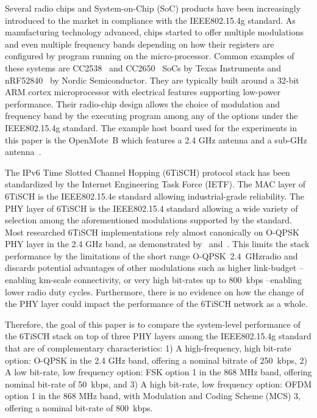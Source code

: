 \documentclass[journal]{IEEEtran}
\newcommand{\oqpsk}        {O-QPSK~2.4~GHz}
\begin{document}

Several radio chips and System-on-Chip (SoC) products have been increasingly introduced to the market in compliance with the IEEE802.15.4g standard. 
As manufacturing technology advanced, chips started to offer multiple modulations and even multiple frequency bands depending on how their registers are configured by program running on the micro-processor.
Common examples of these systems are CC2538~\cite{datasheet_cc2538} and CC2650~\cite{datasheet_cc2650} SoCs by Texas Instruments and nRF52840~\cite{datasheet_nrf52840} by Nordic Semiconductor. 
They are typically built around a 32-bit ARM cortex microprocessor with electrical features supporting low-power performance.
Their radio-chip design allows the choice of modulation and frequency band by the executing program among any of the options under the IEEE802.15.4g standard. 
The example host board used for the experiments in this paper is the OpenMote~B which features a 2.4 GHz antenna and a sub-GHz antenna~\cite{tusetopenmote}.


The IPv6 Time Slotted Channel Hopping (6TiSCH) protocol stack has been  standardized by the Internet Engineering Task Force (IETF).
The MAC layer of 6TiSCH is the IEEE802.15.4e standard allowing industrial-grade reliability.
The PHY layer of 6TiSCH is the IEEE802.15.4 standard allowing a wide variety of selection among the aforementioned modulations supported by the standard.
Most researched 6TiSCH implementations rely almost canonically on O-QPSK PHY layer in the 2.4 GHz band, as demonstrated by~\cite{j.munoz18problem} and~\cite{brachmann19ieee}.
This limits the stack performance by the limitations of the short range \oqpsk radio and discards potential advantages of other modulations such as higher link-budget --enabling km-scale connectivity, or very high bit-rates up to 800~kbps --enabling lower radio duty cycles.
Furthermore, there is no evidence on how the change of the PHY layer could impact the performance of the 6TiSCH network as a whole. 

Therefore, the goal of this paper is to compare the system-level performance of the 6TiSCH stack on top of three PHY layers among the IEEE802.15.4g standard that are of complementary characteristics: 
     1) A high-frequency, high bit-rate option: O-QPSK in the 2.4 GHz band, offering a nominal bitrate of 250~kbps,
     2) A low bit-rate, low frequency option: FSK option 1 in the 868 MHz band, offering nominal bit-rate of 50~kbps, and 
     3) A high bit-rate, low frequency option: OFDM option 1  in the 868 MHz band, with Modulation and Coding Scheme (MCS) 3, offering a nominal bit-rate of 800~kbps. 
\end{document}
